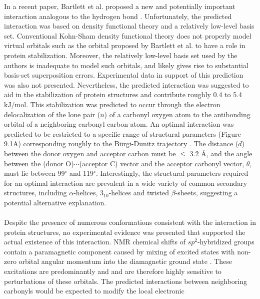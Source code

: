 \begin{doublespace}
In a recent paper, Bartlett et al. proposed a new and potentially
important interaction analogous to the hydrogen bond
\cite{bartlett:ncb2010}. Unfortunately, the predicted \npistar{}
interaction was based on density functional theory and a relatively low-level
basis set. Conventional Kohn-Sham density functional theory does not properly
model virtual orbitals  \cite{mera:physrev2009} such as the \pistar{}
orbital proposed by Bartlett et al. to have a role in protein stabilization.
Moreover, the relatively low-level basis set used by the authors is inadequate
to model such orbitals, and likely gives rise to substantial basis-set
superposition errors. Experimental data in support of this prediction was also
not presented. Nevertheless, the predicted \npistar{} interaction was suggested
to aid in the stabilization of protein structures and contribute roughly 0.4
to 5.4 kJ/mol. This stabilization was predicted to occur through the electron
delocalization of the lone pair ($n$) of a carbonyl oxygen atom to the
antibonding \pistar{} orbital of a neighboring carbonyl carbon atom. An
optimal \npistar{} interaction was predicted to be restricted to a specific
range of structural parameters (Figure 9.1A) corresponding roughly to the
B\"{u}rgi-Dunitz trajectory \cite{burgi:jacs1973}.
The distance ($d$) between the donor oxygen and acceptor
carbon must be $\leq$ 3.2 \r{A}, and the angle between the
(donor O)$\cdots$(acceptor C) vector and the acceptor carbonyl vector,
$\theta$, must lie between 99$^\circ$ and 119$^\circ$. Interestingly, the
structural parameters required for an optimal \npistar{} interaction are
prevalent in a wide variety of common secondary structures, including
$\alpha$-helices, $3_{10}$-helices and twisted $\beta$-sheets, suggesting
a potential alternative explanation.
\\\\
Despite the presence of numerous conformations consistent with the \npistar{}
interaction in protein structures, no experimental evidence was presented
that supported the actual existence of this interaction. NMR chemical shifts of
$sp^2$-hybridized groups contain a paramagnetic component caused by mixing of
excited states with non-zero orbital angular momentum into the diamagnetic
ground state \cite{ramsey:physrev1950}. These excitations are
predominantly \npistar{} and \pipistar{} and are therefore highly sensitive to
perturbations of these orbitals. The predicted \npistar{} interactions between
neighboring carbonyls would be expected to modify the local electronic

\end{doublespace}
